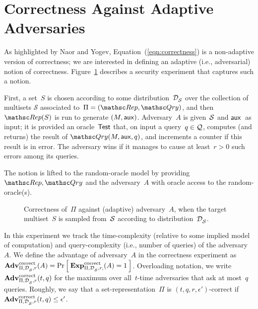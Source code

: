 \section{Correctness Against Adaptive Adversaries}
As highlighted by Naor and Yogev, Equation~(\ref{eqn:correctness}) is a non-adaptive version of correctness;
we are interested in defining an adaptive (i.e., adversarial) notion
of correctness.   Figure~\ref{fig:correctness} describes a security
experiment that captures such a notion.

First, a set~$S$ is chosen according to some
distribution~$\mathcal{D}_{{\cal S}}^{}$ over the collection of multisets
$\mathcal{S}$ associated to~$\Pi=(\Rep,\Qry)$, and then
$\Rep(S)$ is run to generate $(M,{\sf aux})$.
Adversary~$A$ is given~${\cal S}$ and ${\sf aux}$~as input; it is
provided an oracle~$\mathsf{Test}$ that, on input a query~$q \in {\cal Q}$,
computes (and returns) the result of $\Qry(M,\aux,q)$, and increments
a counter if this result is in error.  The adversary wins if it
manages to cause at least~$r>0$ such errors among its queries.

The notion is lifted to the random-oracle model by providing
$\Rep,\Qry$ and the adversary~$A$ with oracle access to the
random-oracle(s).



\begin{figure}[htp]
\centering
{}
\caption{Correctness of~$\Pi$ against (adaptive) adversary~$A$, when
  the target multiset~$S$ is sampled from~${\cal S}$ according to distribution~$\mathcal{D}_{{\cal S}}^{}$.} 
\label{fig:correctness}
\end{figure}

In this experiment we track the time-complexity (relative to some
implied model of computation) and query-complexity (i.e., number of
queries) of the adversary~$A$.  
We define the advantage of adversary~$A$ in the correctness experiment as 
$\mathrm{\mathbf{Adv}}^{\mathrm{correct}}_{\Pi,\mathcal{D}_{{\cal S}}^{},r}(A) = \Pr\left[\: \mathrm{\mathbf{Exp}}^{\mathrm{correct}}_{\Pi,\mathcal{D}_{{\cal S}}^{}, r,}(A)=1 \:\right]$.
Overloading notation, we write $\mathrm{\mathbf{Adv}}^{\mathrm{correct}}_{\Pi,\mathcal{D}_{{\cal S}}^{},r}(t,q)$ for the maximum over all~$t$-time adversaries that ask at most~$q$ queries. Roughly, we say that a
set-representation~$\Pi$ is $(t,q,r,\epsilon')$-correct if $\mathrm{\mathbf{Adv}}^{\mathrm{correct}}_{\Pi,\mathcal{D}_{{\cal S}}^{},r}(t,q) \leq \epsilon'$.  

